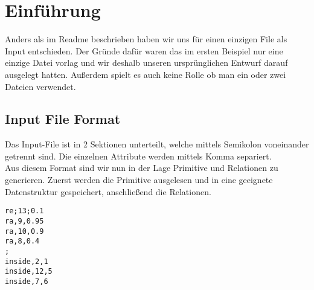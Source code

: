 \chapter{Einführung}
Anders als im Readme beschrieben haben wir uns für einen
einzigen File als Input entschieden. Der Gründe dafür waren
das im ersten Beispiel nur eine einzige Datei vorlag und wir
deshalb unseren ursprünglichen Entwurf darauf ausgelegt hatten.
Außerdem spielt es auch keine Rolle ob man ein oder zwei
Dateien verwendet.\\
\section{Input File Format}
  Das Input-File ist in 2 Sektionen unterteilt, welche mittels
  Semikolon voneinander getrennt sind. Die einzelnen Attribute
  werden mittels Komma separiert.\\
  Aus diesem Format sind wir nun in der Lage Primitive und
  Relationen zu generieren.
  Zuerst werden die Primitive ausgelesen und in eine geeignete
  Datenstruktur gespeichert, anschließend die Relationen.
  \begin{lstlisting}
re;13;0.1
ra,9,0.95
ra,10,0.9
ra,8,0.4
;
inside,2,1
inside,12,5
inside,7,6
\end{lstlisting}